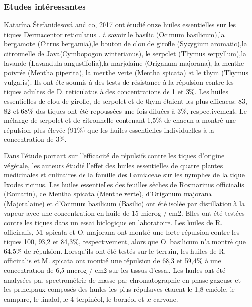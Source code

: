 \documentclass[12pt,a4wide]{article}
\begin{document}
\subsubsection{Etudes intéressantes}
\label{sec-4-3-4}


Katarína Štefanidesová and co, 2017 ont  étudié onze huiles essentielles sur les
tiques  Dermacentor reticulatus  ,  à savoir  le  basilic (Ocimum  basilicum),la
bergamote (Citrus bergamia),le bouton de  clou de girofle (Syzygium aromatic),la
citronnelle de  Java(Cymbopogon winterianus), le serpolet  (Thymus serpyllum),la
lavande (Lavandula  angustifolia),la marjolaine  (Origanum majorana),  la menthe
poivrée (Mentha piperita),  la menthe verte (Mentha spicata) et  le thym (Thymus
vulgaris). Ils ont  été soumis à des  tests de résistance à  la répulsion contre
les tiques adultes de D. reticulatus à des concentrations de 1 et 3\%. Les huiles
essentielles  de clou  de  girofle, de  serpolet  et de  thym  étaient les  plus
efficaces: 83, 82  et 68\% des tiques  ont été repoussées une fois  diluées à 3\%,
respectivement.  Le mélange  de serpolet  et  de citronnelle  contenant 1,5\%  de
chacun a  montré une  répulsion plus  élevée (91\%)  que les  huiles essentielles
individuelles à la concentration de 3\%.



Dans l'étude  \cite{El-Seedi2012} portant  sur l'efficacité de  répulsifs contre
les  tiques   d’origine  végétale,  les   auteurs  étudié  l’effet   des  huiles
essentielles  de quatre  plantes médicinales  et  culinaires de  la famille  des
Lamiaceae sur  les nymphes de la  tique Ixodes ricinus. Les  huiles essentielles
des  feuilles sèches  de  Rosmarinus officinalis  (Romarin),  de Mentha  spicata
(Menthe  verte),   d'Origanum  majorana  (Majoralaine)  et   d'Ocimum  basilicum
(Basilic) ont été isolée par distillation  à la vapeur avec une concentration en
huile de 15 microg / cm2. Elles ont  été testées contre les tiques dans un essai
biologique  en  laboratoire.  Les  huiles  de  R.  officinalis,  M.  spicata  et
O. majorana ont montré une forte répulsion contre les tiques 100, 93,2 et 84,3\%,
respectivement,   alors   que   O.   basilicum   n'a   montré   que   64,5\%   de
répulsion.  Lorsqu’ils   ont  été   testés  sur  le   terrain,  les   huiles  de
R. officinalis  et M. spicata ont  montré une répulsion  de 68,3 et 59,4\%  à une
concentration de  6,5 microg /  cm2 sur les tissus  d’essai. Les huiles  ont été
analysées par spectrométrie de masse par chromatographie en phase gazeuse et les
principaux composés  des huiles les  plus répulsives étaient le  1,8-cinéole, le
camphre, le linalol, le 4-terpinéol, le bornéol et le carvone.
\end{document}
